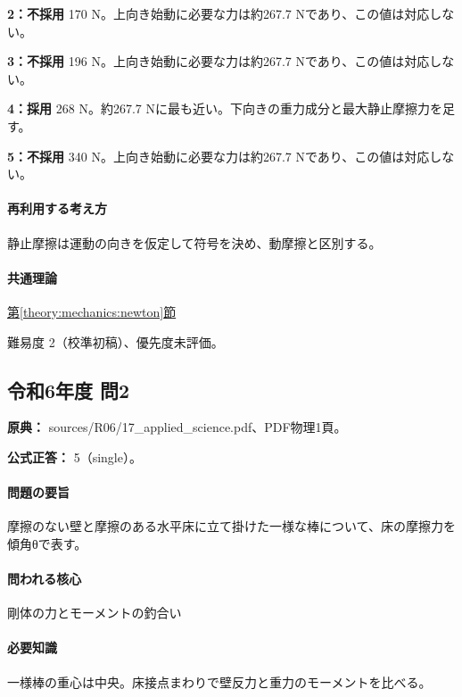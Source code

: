 \noindent\textbf{2：不採用} 170 N。上向き始動に必要な力は約267.7 Nであり、この値は対応しない。\par

\noindent\textbf{3：不採用} 196 N。上向き始動に必要な力は約267.7 Nであり、この値は対応しない。\par

\noindent\textbf{4：採用} 268 N。約267.7 Nに最も近い。下向きの重力成分と最大静止摩擦力を足す。\par

\noindent\textbf{5：不採用} 340 N。上向き始動に必要な力は約267.7 Nであり、この値は対応しない。\par

\paragraph{再利用する考え方} 静止摩擦は運動の向きを仮定して符号を決め、動摩擦と区別する。

\paragraph{共通理論} \hyperref[theory:mechanics:newton]{第\ref*{theory:mechanics:newton}節}

\par 難易度 2（校準初稿）、優先度未評価。

\subsection{令和6年度 問2}
\label{q:r06-reg-applied-02}

\noindent\textbf{原典：} sources/R06/17\_applied\_science.pdf、PDF物理1頁。

\textbf{公式正答：} 5（single）。

\paragraph{問題の要旨} 摩擦のない壁と摩擦のある水平床に立て掛けた一様な棒について、床の摩擦力を傾角θで表す。

\paragraph{問われる核心} 剛体の力とモーメントの釣合い

\paragraph{必要知識} 一様棒の重心は中央。床接点まわりで壁反力と重力のモーメントを比べる。

